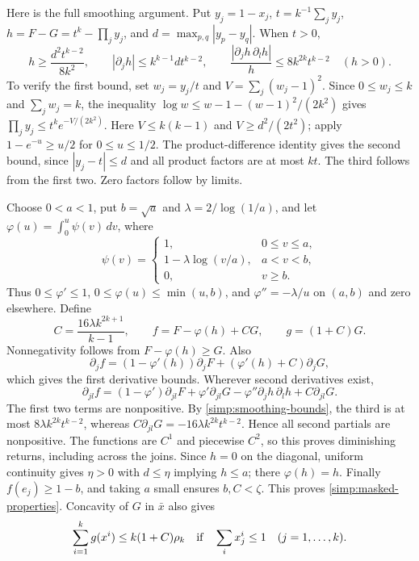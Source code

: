 Here is the full smoothing argument.  Put $y_j=1-x_j$,
$t=k^{-1}\sum_j y_j$, $h=F-G=t^k-\prod_jy_j$, and
$d=\max_{p,q}|y_p-y_q|$.  When $t>0$,
\begin{equation}\label{simp:smoothing-bounds}
 h\ge\frac{d^2t^{k-2}}{8k^2},\qquad
 |\partial_jh|\le k^{k-1}dt^{k-2},\qquad
 \frac{|\partial_jh\,\partial_lh|}{h}
                 \le8k^{2k}t^{k-2}\quad(h>0).
\end{equation}
To verify the first bound, set $w_j=y_j/t$ and
$V=\sum_j(w_j-1)^2$.  Since $0\le w_j\le k$ and
$\sum_jw_j=k$, the inequality
$\log w\le w-1-(w-1)^2/(2k^2)$ gives
$\prod_jy_j\le t^k e^{-V/(2k^2)}$.
Here $V\le k(k-1)$ and $V\ge d^2/(2t^2)$; apply
$1-e^{-u}\ge u/2$ for $0\le u\le1/2$.
The product-difference identity gives the second bound, since
$|y_j-t|\le d$ and all product factors are at most $kt$.
The third follows from the first two.  Zero factors follow by limits.

Choose $0<a<1$, put $b=\sqrt a$ and $\lambda=2/\log(1/a)$,
and let $\varphi(u)=\int_0^u\psi(v)\,dv$, where
\[
 \psi(v)=
 \begin{cases}
 1,&0\le v\le a,\\
 1-\lambda\log(v/a),&a<v<b,\\
 0,&v\ge b.
 \end{cases}
\]
Thus $0\le\varphi'\le1$, $0\le\varphi(u)\le\min(u,b)$,
and $\varphi''=-\lambda/u$ on $(a,b)$ and zero elsewhere.
Define
\[
 C=\frac{16\lambda k^{2k+1}}{k-1},\qquad
 f=F-\varphi(h)+CG,\qquad g=(1+C)G.
\]
Nonnegativity follows from $F-\varphi(h)\ge G$.
Also
\[
 \partial_jf=(1-\varphi'(h))\partial_jF
                   +(\varphi'(h)+C)\partial_jG,
\]
which gives the first derivative bounds.  Wherever second
derivatives exist,
\[
 \partial_{jl}f=(1-\varphi')\partial_{jl}F
    +\varphi'\partial_{jl}G
    -\varphi''\partial_jh\,\partial_lh+C\partial_{jl}G.
\]
The first two terms are nonpositive.  By
\eqref{simp:smoothing-bounds}, the third is at most
$8\lambda k^{2k}t^{k-2}$, whereas
$C\partial_{jl}G=-16\lambda k^{2k}t^{k-2}$.
Hence all second partials are nonpositive.  The functions are
$C^1$ and piecewise $C^2$, so this proves diminishing returns,
including across the joins.  Since $h=0$ on the diagonal,
uniform continuity gives $\eta>0$ with $d\le\eta$ implying
$h\le a$; there $\varphi(h)=h$.
Finally $f(e_j)\ge1-b$, and taking $a$ small ensures
$b,C<\zeta$.  This proves \eqref{simp:masked-properties}.
Concavity of $G$ in $\bar x$ also gives
\begin{equation}\label{simp:reference-sum}
 \sum_{i=1}^k g(x^i)\le k(1+C)\rho_k
 \quad\hbox{if}\quad \sum_i x^i_j\le1\quad(j=1,\ldots,k).
\end{equation}

